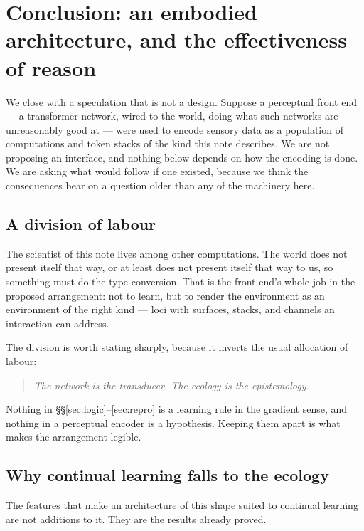 \documentclass[11pt]{article}
\theoremstyle{plain}
\theoremstyle{definition}
\begin{document}
\section{Conclusion: an embodied architecture, and the effectiveness of reason}
\label{sec:conclusion}

We close with a speculation that is not a design. Suppose a perceptual front end --- a transformer
network, wired to the world, doing what such networks are unreasonably good at --- were used to encode
sensory data as a population of computations and token stacks of the kind this note describes. We are
not proposing an interface, and nothing below depends on how the encoding is done. We are asking what
would follow if one existed, because we think the consequences bear on a question older than any of
the machinery here.

\subsection{A division of labour}

The scientist of this note lives among other computations. The world does not present itself that way,
or at least does not present itself that way to us, so something must do the type conversion. That is
the front end's whole job in the proposed arrangement: not to learn, but to render the environment as
an environment of the right kind --- loci with surfaces, stacks, and channels an interaction can
address.

The division is worth stating sharply, because it inverts the usual allocation of labour:

\begin{quote}
\itshape The network is the transducer. The ecology is the epistemology.
\end{quote}

Nothing in \S\S\ref{sec:logic}--\ref{sec:repro} is a learning rule in the gradient sense, and nothing
in a perceptual encoder is a hypothesis. Keeping them apart is what makes the arrangement legible.

\subsection{Why continual learning falls to the ecology}

The features that make an architecture of this shape suited to continual learning are not additions to
it. They are the results already proved.
\end{document}
